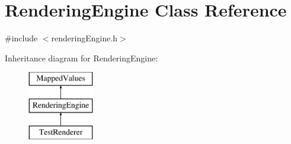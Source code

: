 \hypertarget{class_rendering_engine}{}\section{Rendering\+Engine Class Reference}
\label{class_rendering_engine}


{\ttfamily \#include $<$rendering\+Engine.\+h$>$}

Inheritance diagram for Rendering\+Engine\+:\begin{figure}[H]
\begin{center}
\leavevmode
\includegraphics[height=3.000000cm]{class_rendering_engine}
\end{center}
\end{figure}
